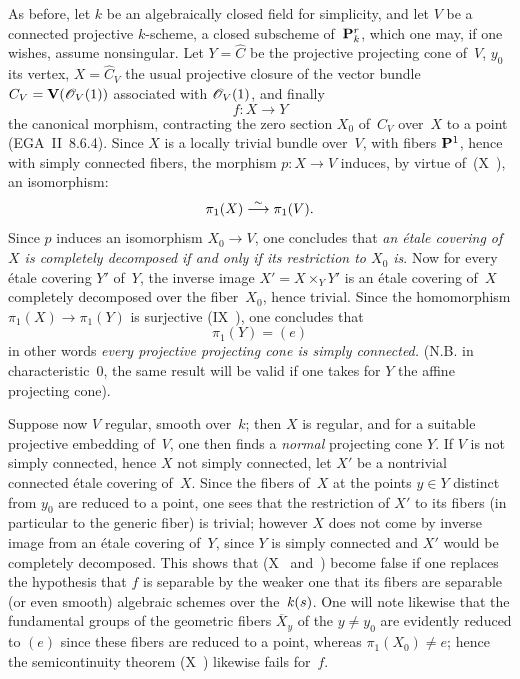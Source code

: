 As before, let $k$ be an algebraically closed field for simplicity, and
let $V$ be a connected projective $k$-scheme, a closed
subscheme of~$\mathbf{P}^r_k$, which one may, if one wishes, assume
nonsingular. Let $Y=\hat C$ be the projective projecting cone of~$V$,
$y_0$ its vertex, $X=\hat C_V$ the usual projective closure of the
vector bundle $C_V=\VV(\cal{O}_V(1))$ associated with
$\cal{O}_V(1)$, and finally
$$
f\colon X\to Y
$$
the canonical morphism, contracting the zero section $X_0$ of~$C_V$
over~$X$ to a point (EGA~II~8.6.4). Since $X$ is a locally
trivial bundle over~$V$, with fibers $\mathbf{P}^1$, hence with
simply connected fibers, the morphism $p\colon X\to V$ induces, by virtue
of~(X~),
an isomorphism:
$$
\pi_1(X)\overset{\sim}{\longrightarrow}\pi_1(V).
$$
Since $p$ induces an isomorphism $X_0\to V$, one concludes that \emph{an
\'etale covering of~$X$ is completely decomposed
if and only if its restriction to $X_0$ is}. Now for every
\'etale covering $Y'$ of~$Y$, the inverse image $X'=X\times_Y
Y'$ is an \'etale covering of~$X$ completely
decomposed over the fiber~$X_0$, hence trivial. Since
the homomorphism $\pi_1(X)\to\pi_1(Y)$ is surjective (IX~),
one concludes that
$$
\pi_1(Y)=(e)
$$
in other words \emph{every projective projecting cone is
simply connected.} (N.B. in characteristic~$0$, the
same result will be valid if one takes for $Y$ the affine projecting
cone).

Suppose now $V$ regular, \ie smooth over~$k$; then
$X$ is regular, and for a suitable projective embedding
of~$V$, one then finds a \emph{normal} projecting cone $Y$. If
$V$ is not simply connected, hence $X$ not simply connected,
let $X'$ be a nontrivial connected \'etale covering
of~$X$. Since the fibers of~$X$ at the points $y\in Y$ distinct from
$y_0$ are reduced to a point, one sees that the restriction of
$X'$ to its fibers (in particular to the
generic
fiber) is trivial; however $X$ does not come by
inverse image from an \'etale covering of~$Y$, since $Y$ is
simply connected and $X'$ would be completely
decomposed. This shows that (X~ and~)
become false if one replaces the hypothesis that $f$ is
separable by the weaker one that its fibers are separable
(or even smooth) algebraic schemes over
the~$\mathit{k}(s)$. One will note likewise that the fundamental groups of the
geometric fibers $\overline X_y$ of the $y\neq y_0$ are
evidently reduced to $(e)$ since these fibers are
reduced to a point, whereas $\pi_1(X_0)\neq e$; hence the
semicontinuity theorem (X~) likewise
fails for~$f$.

